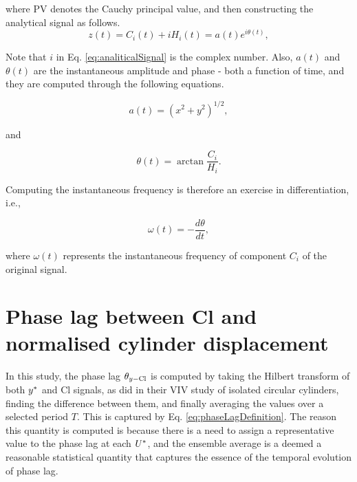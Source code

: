 \documentclass[oneside]{utmthesis}
\begin{document}
\noindent where PV denotes the Cauchy principal value, and then constructing the analytical signal as follows.
\begin{equation}
  z \left( t \right) = C_{i} \left( t \right) + i H_{i} \left( t \right) = a(t)e^{i\theta(t)},
  \label{eq:analiticalSignal}
\end{equation}

\noindent Note that $i$ in Eq. \ref{eq:analiticalSignal} is the complex number.
Also, $a(t)$ and $\theta(t)$ are the instantaneous amplitude and phase - both a function of time, and they are computed through the following equations.

\begin{equation}
  a(t) = \left( x^{2} + y^{2} \right)^{1/2}, 
  \label{eq:instAmplitude}
\end{equation}

\noindent and

\begin{equation}
  \theta(t) = \arctan{\frac{C_{i}}{H_{i}}}.
  \label{eq:instPhase}
\end{equation}

\noindent Computing the instantaneous frequency is therefore an exercise in differentiation, i.e.,

\begin{equation}
  \omega(t) = - \frac{d\theta}{dt},
  \label{eq:instFrequency}
\end{equation}

\noindent where $\omega(t)$ represents the instantaneous frequency of component $C_{i}$ of the original signal.

\section{Phase lag between Cl and normalised cylinder displacement} \label{sec:phaseLag90}

In this study, the phase lag $\theta_{y-\text{Cl}}$ is computed by taking the Hilbert transform of both $y^{*}$ and Cl signals, as \citet{Khalak1999} did in their VIV study of isolated circular cylinders, finding the difference between them, and finally averaging the values over a selected period $T$. This is captured by Eq. \ref{eq:phaseLagDefinition}. The reason this quantity is computed is because there is a need to assign a representative value to the phase lag at each $U^{*}$, and the ensemble average is a deemed a reasonable statistical quantity that captures the essence of the temporal evolution of phase lag.
\end{document}
